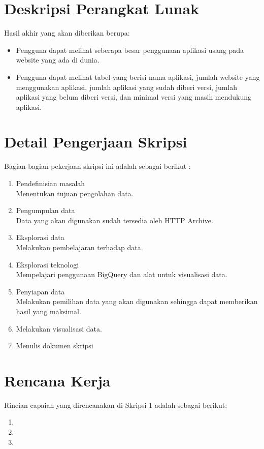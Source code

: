 \documentclass[a4paper,twoside]{article}
\begin{document}
	\section{Deskripsi Perangkat Lunak}
	Hasil akhir yang akan diberikan berupa:
	\begin{itemize}
		\item Pengguna dapat melihat seberapa besar penggunaan aplikasi usang pada website yang ada di dunia.
		\item Pengguna dapat melihat tabel yang berisi nama aplikasi, jumlah website yang menggunakan aplikasi, jumlah aplikasi yang sudah diberi versi, jumlah aplikasi yang belum diberi versi, dan  minimal versi yang masih mendukung aplikasi. 
	\end{itemize}
	
	\section{Detail Pengerjaan Skripsi}
	Bagian-bagian pekerjaan skripsi ini adalah sebagai berikut :
	\begin{enumerate}
		\item Pendefinisian masalah\\
		Menentukan tujuan pengolahan data.
		\item Pengumpulan data\\
		Data yang akan digunakan sudah tersedia oleh HTTP Archive.
		\item Eksplorasi data\\
		Melakukan pembelajaran terhadap data.
		\item Eksplorasi teknologi\\
		Mempelajari penggunaan BigQuery dan alat untuk visualisasi data.
		\item Penyiapan data\\
		Melakukan pemilihan data yang akan digunakan sehingga dapat memberikan hasil yang maksimal.
		\item Melakukan visualisasi data.
		\item Menulis dokumen skripsi
	\end{enumerate}
	
	\section{Rencana Kerja}
	Rincian capaian yang direncanakan di Skripsi 1 adalah sebagai berikut:
	\begin{enumerate}
		\item 
		\item 
		\item
	\end{enumerate}
	
\end{document}
